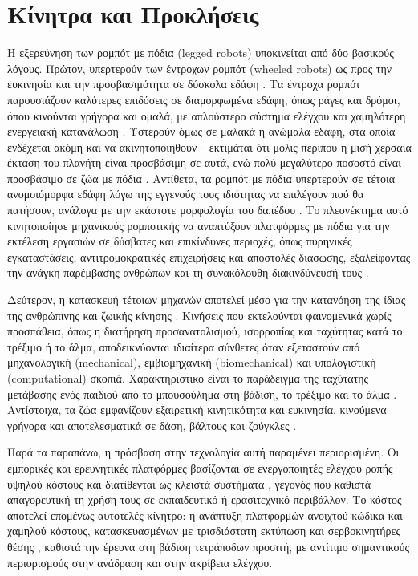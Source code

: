 \documentclass[11pt]{report}
\begin{document}
\section{Κίνητρα και Προκλήσεις}
Η εξερεύνηση των ρομπότ με πόδια (legged robots) υποκινείται από δύο βασικούς
λόγους. Πρώτον, υπερτερούν των έντροχων ρομπότ (wheeled robots) ως προς την ευκινησία
και την προσβασιμότητα σε δύσκολα εδάφη
\cite{raibert_legged_1986,li_quadruped_2025,bledt_mit_2018}. Τα έντροχα ρομπότ
παρουσιάζουν καλύτερες επιδόσεις σε διαμορφωμένα εδάφη, όπως ράγες και δρόμοι,
όπου κινούνται γρήγορα και ομαλά, με απλούστερο σύστημα ελέγχου και χαμηλότερη
ενεργειακή κατανάλωση \cite{fan_review_2024}. Υστερούν όμως σε μαλακά ή ανώμαλα
εδάφη, στα οποία ενδέχεται ακόμη και να ακινητοποιηθούν· εκτιμάται ότι μόλις
περίπου η μισή χερσαία έκταση του πλανήτη είναι προσβάσιμη σε αυτά, ενώ πολύ
μεγαλύτερο ποσοστό είναι προσβάσιμο σε ζώα με πόδια \cite{raibert_legged_1986}.
Αντίθετα, τα ρομπότ με πόδια υπερτερούν σε τέτοια ανομοιόμορφα εδάφη λόγω της
εγγενούς τους ιδιότητας να επιλέγουν πού θα πατήσουν, ανάλογα με την εκάστοτε
μορφολογία του δαπέδου
\cite{bares_configuration_1993,hyun_high_2014,raibert_legged_1986}. Το πλεονέκτημα
αυτό κινητοποίησε μηχανικούς ρομποτικής να αναπτύξουν πλατφόρμες με πόδια για την
εκτέλεση εργασιών σε δύσβατες και επικίνδυνες περιοχές, όπως πυρηνικές
εγκαταστάσεις, αντιτρομοκρατικές επιχειρήσεις και αποστολές διάσωσης,
εξαλείφοντας την ανάγκη παρέμβασης ανθρώπων και τη συνακόλουθη διακινδύνευσή τους
\cite{fan_review_2024,hyun_high_2014}.

Δεύτερον, η κατασκευή τέτοιων μηχανών αποτελεί μέσο για την κατανόηση της ίδιας
της ανθρώπινης και ζωικής κίνησης \cite{raibert_legged_1986}. Κινήσεις που
εκτελούνται φαινομενικά χωρίς προσπάθεια, όπως η διατήρηση προσανατολισμού,
ισορροπίας και ταχύτητας κατά το τρέξιμο ή το άλμα, αποδεικνύονται ιδιαίτερα
σύνθετες όταν εξεταστούν από μηχανολογική (mechanical), εμβιομηχανική
(biomechanical) και υπολογιστική (computational) σκοπιά. Χαρακτηριστικό είναι το
παράδειγμα της ταχύτατης μετάβασης ενός παιδιού από το μπουσούλημα στη βάδιση, το
τρέξιμο και το άλμα \cite{raibert_legged_1986}. Αντίστοιχα, τα ζώα εμφανίζουν
εξαιρετική κινητικότητα και ευκινησία, κινούμενα γρήγορα και αποτελεσματικά σε
δάση, βάλτους και ζούγκλες \cite{raibert_legged_1986}.

Παρά τα παραπάνω, η πρόσβαση στην τεχνολογία αυτή παραμένει περιορισμένη. Οι
εμπορικές και ερευνητικές πλατφόρμες βασίζονται σε ενεργοποιητές ελέγχου ροπής
υψηλού κόστους και διατίθενται ως κλειστά συστήματα
\cite{bostondynamics_spot,hutter_anymal_2016}, γεγονός που καθιστά απαγορευτική τη
χρήση τους σε εκπαιδευτικό ή ερασιτεχνικό περιβάλλον. Το κόστος αποτελεί
επομένως αυτοτελές κίνητρο: η ανάπτυξη πλατφορμών ανοιχτού κώδικα και χαμηλού
κόστους, κατασκευασμένων με τρισδιάστατη εκτύπωση και σερβοκινητήρες θέσης
\cite{kim_spotmicro_2019,spotmicroai_project}, καθιστά την έρευνα στη βάδιση
τετράποδων προσιτή, με αντίτιμο σημαντικούς περιορισμούς στην ανάδραση και στην
ακρίβεια ελέγχου.
\end{document}
